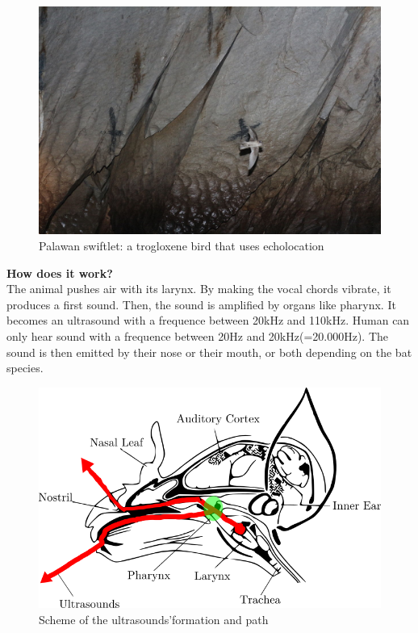 \documentclass[draft, final]{report}
\begin{document}
\begin{figure}[!ht]
  \centering
  \includegraphics[scale=0.25]{LateX/Images/palawanswiftled.png}
  \caption{Palawan swiftlet: a trogloxene bird that uses echolocation\cite{palawanswiftlet}}
\end{figure}
\clearpage

\textbf{How does it work?}\\

The animal pushes air with its larynx. By making the vocal chords vibrate, it produces a first sound. Then, the sound is amplified by organs like pharynx. It becomes an ultrasound with a frequence between 20kHz and 110kHz. Human can only hear sound with a frequence between 20Hz and 20kHz(=20.000Hz). The sound is then emitted by their nose or their mouth, or both depending on the bat species.\\
\newline
\begin{figure}[!ht]
  \centering
  \includegraphics[scale=1]{LateX/Images/batskull.png}
  \caption{Scheme of the ultrasounds'formation and path\cite{batskull}}
\end{figure}
\end{document}
